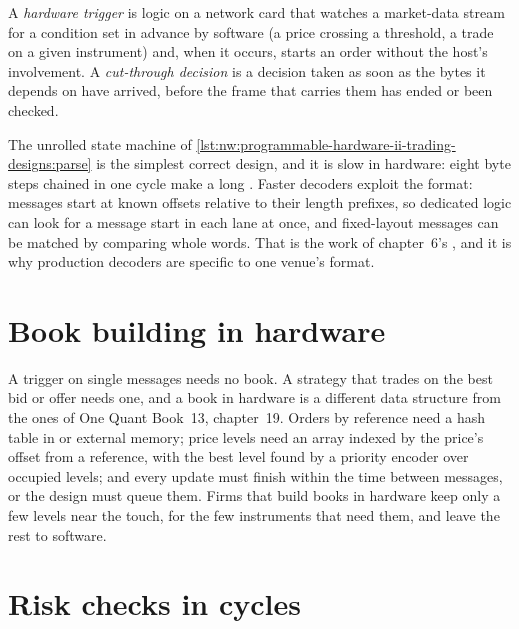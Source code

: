 \begin{definition}\label{def:nw:programmable-hardware-ii-trading-designs:trigger}
A \emph{hardware trigger} is logic on a network card that watches a market-data stream for a condition set in
advance by software (a price crossing a threshold, a trade on a given instrument) and, when it occurs, starts an order without the
host's involvement. A \emph{cut-through decision} is a decision taken as soon as the bytes it depends on
have arrived, before the frame that carries them has ended or been checked.
\end{definition}

The unrolled state machine of \cref{lst:nw:programmable-hardware-ii-trading-designs:parse} is the simplest correct design, and it is
slow in hardware: eight byte steps chained in one cycle make a long . Faster decoders exploit the format: messages start at
known offsets relative to their length prefixes, so dedicated logic can look for a message start in each lane at once, and fixed-layout
messages can be matched by comparing whole words. That is the work of chapter~6's , and it is why production decoders are
specific to one venue's format.

\section{Book building in hardware}

A trigger on single messages needs no book. A strategy that trades on the best bid or offer needs one, and a book in hardware is a
different data structure from the ones of One Quant Book~13, chapter~19. Orders by reference need a hash table in  or external
memory; price levels need an array indexed by the price's offset from a reference, with the best level found by a priority encoder over
occupied levels; and every update must finish within the time between messages, or the design must queue them. Firms that build books
in hardware keep only a few levels near the touch, for the few instruments that need them, and leave the rest to software.

\section{Risk checks in cycles}

